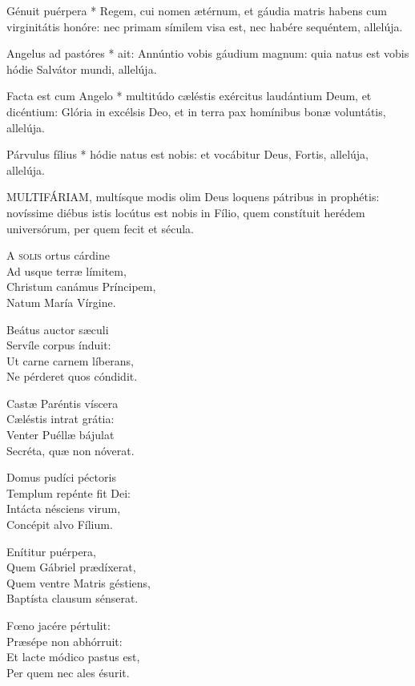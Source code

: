 
 Génuit puérpera * Regem, cui nomen ætérnum, et gáudia matris habens cum virginitátis honóre: nec primam símilem visa est, nec habére sequéntem, allelúja.

 Angelus ad pastóres * ait: Annúntio vobis gáudium magnum: quia natus est vobis hódie Salvátor mundi, allelúja.

 Facta est cum Angelo * multitúdo cæléstis exércitus laudántium Deum, et dicéntium: Glória in excélsis Deo, et in terra pax homínibus bonæ voluntátis, allelúja.

 Párvulus fílius * hódie natus est nobis: et vocábitur Deus, Fortis, allelúja, allelúja.


\lettrine[lines=2]{M}{ULTIFÁRIAM}, multísque modis olim Deus loquens pátribus in prophétis: novíssime diébus istis locútus est nobis in Fílio, quem constítuit herédem universórum, per quem fecit et sécula.


\lettrine[lines=2]{A}{} \textsc{solis} ortus cárdine\\
Ad usque terræ límitem,\\
Christum canámus Príncipem,\\
Natum María Vírgine.

Beátus auctor sæculi\\
Servíle corpus índuit:\\
Ut carne carnem líberans,\\
Ne pérderet quos cóndidit.

Castæ Paréntis víscera\\
Cæléstis intrat grátia:\\
Venter Puéllæ bájulat\\
Secréta, quæ non nóverat.

Domus pudíci péctoris\\
Templum repénte fit Dei:\\
Intácta nésciens virum,\\
Concépit alvo Fílium.

Enítitur puérpera,\\
Quem Gábriel prædíxerat,\\
Quem ventre Matris géstiens,\\
Baptísta clausum sénserat.

Fœno jacére pértulit:\\
Præsépe non abhórruit:\\
Et lacte módico pastus est,\\
Per quem nec ales ésurit.


